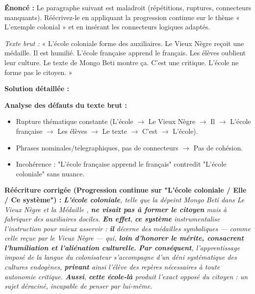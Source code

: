 \documentclass[11pt]{article}
\newcommand{\cle}[1]{{\popxbold\color{popdark}#1}}
\begin{document}
\begin{exoresolu}
    \textbf{Énoncé :} Le paragraphe suivant est maladroit (répétitions, ruptures, connecteurs manquants). Réécrivez-le en appliquant la \cle{progression continue} sur le thème « L'exemple colonial » et en insérant les connecteurs logiques adaptés.
    
    \emph{Texte brut :} « L'école coloniale forme des auxiliaires. Le Vieux Nègre reçoit une médaille. Il est humilié. L'école française apprend le français. Les élèves oublient leur culture. Le texte de Mongo Beti montre ça. C'est une critique. L'école ne forme pas le citoyen. »
    
    \tcblower
    \textbf{Solution détaillée :}
    
    \textbf{Analyse des défauts du texte brut :}
    \begin{itemize}
        \item Rupture thématique constante (L'école $\rightarrow$ Le Vieux Nègre $\rightarrow$ Il $\rightarrow$ L'école française $\rightarrow$ Les élèves $\rightarrow$ Le texte $\rightarrow$ C'est $\rightarrow$ L'école).
        \item Phrases nominales/telegraphiques, pas de connecteurs $\rightarrow$ Pas de cohésion.
        \item Incohérence : "L'école française apprend le français" contredit "L'école coloniale" sans nuance.
    \end{itemize}
    
    \textbf{Réécriture corrigée (Progression continue sur "L'école coloniale / Elle / Ce système") :}
    \emph{\textbf{L'école coloniale}, telle que la dépeint Mongo Beti dans \og Le Vieux Nègre et la Médaille \fg{}, \textbf{ne visait pas à former le citoyen} mais à fabriquer des auxiliaires dociles. \textbf{En effet}, \textbf{ce système} instrumentalise l'instruction pour mieux asservir : \textbf{il} décerne des médailles symboliques — comme celle reçue par le Vieux Nègre — qui, \textbf{loin d'honorer le mérite, consacrent l'humiliation et l'aliénation culturelle.} \textbf{Par conséquent}, l'apprentissage imposé de la langue du colonisateur s'accompagne d'un déni systématique des cultures endogènes, \textbf{privant} ainsi l'élève des repères nécessaires à toute autonomie critique. \textbf{Aussi}, \textbf{cette école-là} produit l'exact opposé du citoyen : un sujet déraciné, incapable de penser par lui-même.}
    

\end{exoresolu}
\end{document}
